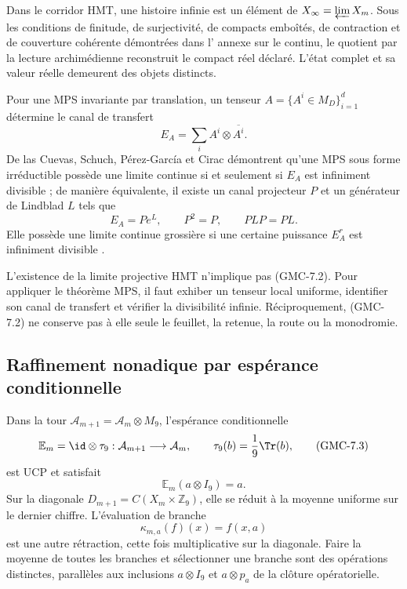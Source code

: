 Dans le corridor HMT, une histoire infinie est un élément de
$X_\infty=\varprojlim X_m$. Sous les conditions de finitude, de surjectivité,
de compacts emboîtés, de contraction et de couverture cohérente démontrées dans l'
annexe sur le continu, le quotient par la lecture archimédienne reconstruit le
compact réel déclaré. L'état complet et sa valeur réelle demeurent des
objets distincts.

Pour une MPS invariante par translation, un tenseur
$A=\{A^i\in M_D\}_{i=1}^d$ détermine le canal de transfert
\[
 E_A=\sum_i A^i\otimes\overline{A^i}.
 \tag{GMC-7.1}
\]
De las Cuevas, Schuch, Pérez-García et Cirac démontrent qu'une MPS sous forme
irréductible possède une limite continue si et seulement si $E_A$ est infiniment
divisible ; de manière équivalente, il existe un canal projecteur $P$ et un générateur
de Lindblad $L$ tels que
\[
 E_A=Pe^L,
 \qquad P^2=P,
 \qquad PLP=PL.
 \tag{GMC-7.2}
\]
Elle possède une limite continue grossière si une certaine puissance $E_A^r$ est infiniment
divisible \citep{delascuevas2018continuum}.

\begin{controlbox}
L'existence de la limite projective HMT n'implique pas \textup{(GMC-7.2)}. Pour appliquer le
théorème MPS, il faut exhiber un tenseur local uniforme, identifier son canal de
transfert et vérifier la divisibilité infinie. Réciproquement,
\textup{(GMC-7.2)} ne conserve pas à elle seule le feuillet, la retenue, la route ou la monodromie.
\end{controlbox}
\fi

\ifdefined\HMTGMCOperatorialTower
\subsection{Raffinement nonadique par espérance conditionnelle}
\label{p12-83-c22-s7:gmc:sec:refinamiento-condicional}

Dans la tour
$\mathcal A_{m+1}=\mathcal A_m\otimes M_9$, l'espérance conditionnelle
\[
 \mathbb E_m=\id\otimes\tau_9:
 \mathcal A_{m+1}\longrightarrow\mathcal A_m,
 \qquad \tau_9(b)=\frac1{9}\Tr(b),
 \tag{GMC-7.3}
\]
est UCP et satisfait
\[
 \mathbb E_m(a\otimes I_9)=a.
 \tag{GMC-7.4}
\]
Sur la diagonale $D_{m+1}=C(X_m\times\mathbb Z_9)$, elle se réduit à la moyenne
uniforme sur le dernier chiffre. L'évaluation de branche
\[
 \kappa_{m,a}(f)(x)=f(x,a)
 \tag{GMC-7.5}
\]
est une autre rétraction, cette fois multiplicative sur la diagonale. Faire la moyenne de toutes
les branches et sélectionner une branche sont des opérations distinctes, parallèles aux
inclusions $a\otimes I_9$ et $a\otimes p_a$ de la clôture opératorielle.

